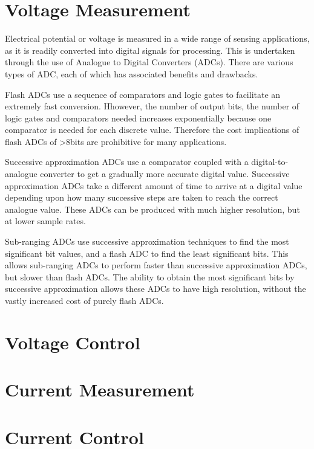 \section{Voltage Measurement}
Electrical potential or voltage is measured in a wide range of sensing applications, as it is readily converted into digital signals for processing. This is undertaken through the use of Analogue to Digital Converters (ADCs). There are various types of ADC, each of which has associated benefits and drawbacks.

Flash ADCs use a sequence of comparators and logic gates to facilitate an extremely fast conversion. Hhowever, the number of output bits, the number of logic gates and comparators needed increases exponentially because one comparator is needed for each discrete value. Therefore the cost implications of flash ADCs of >8bits are prohibitive for many applications.

Successive approximation ADCs use a comparator coupled with a digital-to-analogue converter to get a gradually more accurate digital value. Successive approximation ADCs take a different amount of time to arrive at a digital value depending upon how many successive steps are taken to reach the correct analogue value. These ADCs can be produced with much higher resolution, but at lower sample rates.

Sub-ranging ADCs use successive approximation techniques to find the most significant bit values, and a flash ADC to find the least significant bits. This allows sub-ranging ADCs to perform faster than successive approximation ADCs, but slower than flash ADCs. The ability to obtain the most significant bits by successive approximation allows these ADCs to have high resolution, without the vastly increased cost of purely flash ADCs.




\section{Voltage Control}


\section{Current Measurement}


\section{Current Control}